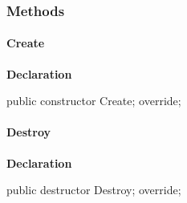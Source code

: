 \documentclass{report}
\newif\ifpdf
\begin{document}
\subsubsection*{\large{\textbf{Methods}}\normalsize\hspace{1ex}\hfill}
\paragraph*{Create}\hspace*{\fill}

\label{opbitmapformats.TGIFImage-Create}
\begin{list}{}{
\setlength{\itemindent}{0cm}
\setlength{\listparindent}{0cm}
\setlength{\leftmargin}{\evensidemargin}
\addtolength{\leftmargin}{\tmplength}
\settowidth{\labelsep}{X}
\addtolength{\leftmargin}{\labelsep}
\setlength{\labelwidth}{\tmplength}
}
\item[\textbf{Declaration}\hfill]
\ifpdf
\begin{flushleft}
\fi
\begin{ttfamily}
public constructor Create; override;\end{ttfamily}

\ifpdf
\end{flushleft}
\fi

\end{list}
\paragraph*{Destroy}\hspace*{\fill}

\label{opbitmapformats.TGIFImage-Destroy}
\begin{list}{}{
\setlength{\itemindent}{0cm}
\setlength{\listparindent}{0cm}
\setlength{\leftmargin}{\evensidemargin}
\addtolength{\leftmargin}{\tmplength}
\settowidth{\labelsep}{X}
\addtolength{\leftmargin}{\labelsep}
\setlength{\labelwidth}{\tmplength}
}
\item[\textbf{Declaration}\hfill]
\ifpdf
\begin{flushleft}
\fi
\begin{ttfamily}
public destructor Destroy; override;\end{ttfamily}

\ifpdf
\end{flushleft}
\fi

\end{list}
\end{document}
